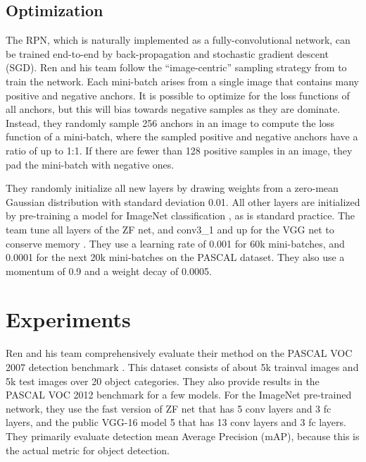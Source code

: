 \documentclass[10pt,twocolumn,letterpaper]{article}
\begin{document}
\subsection{Optimization}

The RPN, which is naturally implemented as a fully-convolutional network, can be trained end-to-end by back-propagation and stochastic gradient descent (SGD). Ren and his team follow the ``image-centric'' sampling strategy from \cite{Girshick2015Fast} to train the network. Each mini-batch arises from a single image that contains many positive and negative anchors. It is possible to optimize for the loss functions of all anchors, but this will bias towards negative samples as they are dominate. Instead, they randomly sample 256 anchors in an image to compute the loss function of a mini-batch, where the sampled positive and negative anchors have a ratio of up to 1:1. If there are fewer than 128 positive samples in an image, they pad the mini-batch with negative ones.

They randomly initialize all new layers by drawing weights from a zero-mean Gaussian distribution with standard deviation 0.01. All other layers are initialized by pre-training a model for ImageNet classification \cite{Russakovsky2015ImageNet}, as is standard practice. The team tune all layers of the ZF net, and conv3\_1 and up for the VGG net to conserve memory \cite{Girshick2015Fast}. They use a learning rate of 0.001 for 60k mini-batches, and 0.0001 for the next 20k mini-batches on the PASCAL dataset. They also use a momentum of 0.9 and a weight decay of 0.0005.

\section{Experiments}

Ren and his team comprehensively evaluate their method on the PASCAL VOC 2007 detection benchmark \cite{Everingham2005The}. This dataset consists of about 5k trainval images and 5k test images over 20 object categories. They also provide results in the PASCAL VOC 2012 benchmark for a few models. For the ImageNet pre-trained network, they use the fast version of ZF net \cite{Zeiler2014Visualizing} that has 5 conv layers and 3 fc layers, and the public VGG-16 model 5 that has 13 conv layers and 3 fc layers. They primarily evaluate detection mean Average Precision (mAP), because this is the actual metric for object detection.
\end{document}
